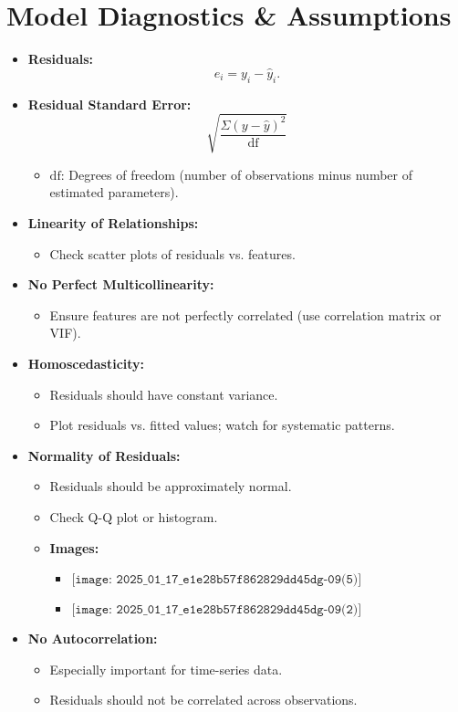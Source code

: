 \documentclass[10pt]{article}
\begin{document}
\section{Model Diagnostics \& Assumptions}
\begin{itemize}
    \item \textbf{Residuals:}
    \[
    e_{i} = y_{i} - \hat{y}_{i}.
    \]
    \item \textbf{Residual Standard Error:}
    \[
    \sqrt{\frac{\Sigma (y-\hat{y})^2}{\mathrm{df}}}
    \]
    \begin{itemize}
        \item \(\mathrm{df}\): Degrees of freedom (number of observations minus number of estimated parameters).
    \end{itemize}
    \item \textbf{Linearity of Relationships:}
    \begin{itemize}
        \item Check scatter plots of residuals vs. features.
    \end{itemize}
    \item \textbf{No Perfect Multicollinearity:}
    \begin{itemize}
        \item Ensure features are not perfectly correlated (use correlation matrix or VIF).
    \end{itemize}
    \item \textbf{Homoscedasticity:}
    \begin{itemize}
        \item Residuals should have constant variance.
        \item Plot residuals vs. fitted values; watch for systematic patterns.
    \end{itemize}
    \item \textbf{Normality of Residuals:}
    \begin{itemize}
        \item Residuals should be approximately normal.
        \item Check Q-Q plot or histogram.
        \item \textbf{Images:}
        \begin{itemize}
            \item \(\texttt{[image: 2025\_01\_17\_e1e28b57f862829dd45dg-09(5)]}\)
            \item \(\texttt{[image: 2025\_01\_17\_e1e28b57f862829dd45dg-09(2)]}\)
        \end{itemize}
    \end{itemize}
    \item \textbf{No Autocorrelation:}
    \begin{itemize}
        \item Especially important for time-series data.
        \item Residuals should not be correlated across observations.
    \end{itemize}
\end{itemize}
\end{document}
